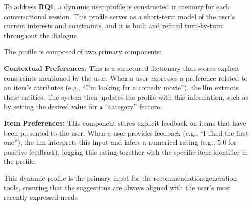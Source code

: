 To address \textbf{RQ1}, a dynamic user profile is constructed in memory for each conversational session. This profile serves as a short-term model of the user's current interests and constraints, and it is built and refined turn-by-turn throughout the dialogue.

The profile is composed of two primary components:
\begin{compactitem}[\textbullet]
    \item \textbf{Contextual Preferences:} This is a structured dictionary that stores explicit constraints mentioned by the user. When a user expresses a preference related to an item's attributes (e.g., ``I'm looking for a comedy movie''), the \ac{llm} extracts these entities. The system then updates the profile with this information, such as by setting the desired value for a ``category'' feature.
    \item \textbf{Item Preferences:} This component stores explicit feedback on items that have been presented to the user. When a user provides feedback (e.g., ``I liked the first one''), the \ac{llm} interprets this input and infers a numerical rating (e.g., 5.0 for positive feedback), logging this rating together with the specific item identifier in the profile.
\end{compactitem}

This dynamic profile is the primary input for the recommendation-generation tools, ensuring that the suggestions are always aligned with the user's most recently expressed needs.